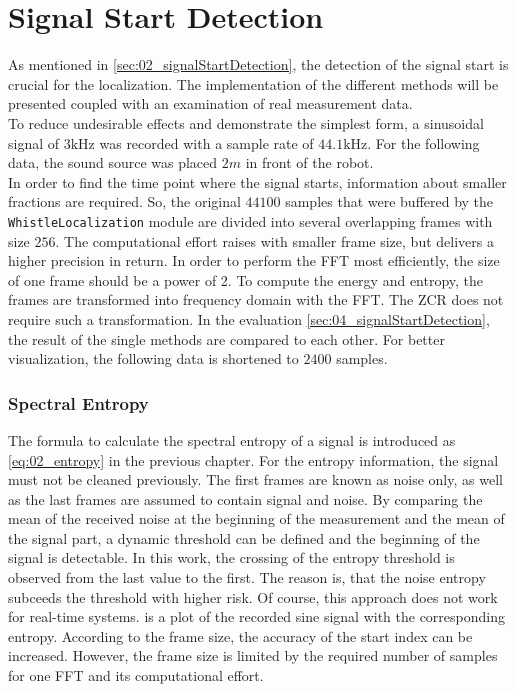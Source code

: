 \section{Signal Start Detection}
\label{sec:03_signalStartDetection}

As mentioned in \cref{sec:02_signalStartDetection}, the detection of the
signal start is crucial for the localization.
The implementation of the different methods will be presented coupled with
an examination of real measurement data.
\\
To reduce undesirable effects and demonstrate the simplest form, a sinusoidal
signal of $3\si{\kilo\hertz}$ was recorded with a sample rate of $44.1\si{\kilo\hertz}$.
For the following data, the sound source was placed $2\si{m}$ in front of the robot.
\\
In order to find the time point where the signal starts, information about
smaller fractions are required.
So, the original $44100$ samples that were buffered by the
\lstinline!WhistleLocalization! module are divided into several overlapping
frames with size $256$. The computational effort raises with smaller frame size,
but delivers a higher precision in return.
In order to perform the \ac{FFT} most efficiently, the size of one frame
should be a power of 2.
To compute the energy and entropy, the frames are transformed into
frequency domain with the \ac{FFT}.
The \ac{ZCR} does not require such a transformation.
In the evaluation \cref{sec:04_signalStartDetection}, the result of the single
methods are compared to each other.
For better visualization, the following data is shortened to $2400$ samples.


\subsubsection*{Spectral Entropy}

The formula to calculate the spectral entropy of a signal is introduced as \cref{eq:02_entropy}
in the previous chapter.
For the entropy information, the signal must not be cleaned previously.
The first frames are known as noise only, as well as the last frames are assumed
to contain signal and noise.
By comparing the mean of the received noise at the beginning of the measurement and
the mean of the signal part, a dynamic threshold can be defined and the beginning of the
signal is detectable.
In this work, the crossing of the entropy threshold is observed from the last
value to the first. The reason is, that the noise entropy subceeds the threshold with higher risk.
Of course, this approach does not work for real-time systems.
 is a plot of the recorded sine signal with the corresponding
entropy.
According to the frame size, the accuracy of the start index can be increased.
However, the frame size is limited by the required number of samples for one \ac{FFT} and
its computational effort.

